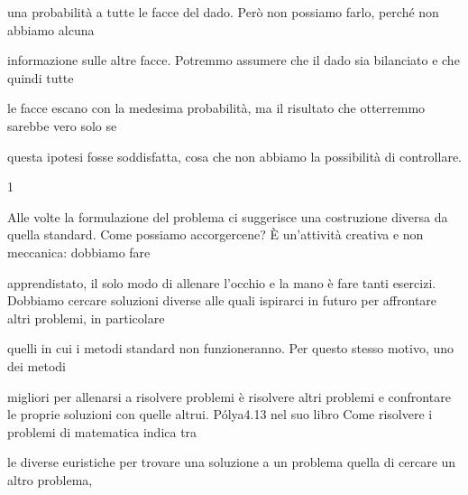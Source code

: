 \documentclass[a4paper,portrait,12pt]{article}
\begin{document}
\begin{flushleft}
una probabilit\`{a} a tutte le facce del dado. Per\`{o} non possiamo farlo, perch\'{e} non abbiamo alcuna
\end{flushleft}


\begin{flushleft}
informazione sulle altre facce. Potremmo assumere che il dado sia bilanciato e che quindi tutte
\end{flushleft}


\begin{flushleft}
le facce escano con la medesima probabilit\`{a}, ma il risultato che otterremmo sarebbe vero solo se
\end{flushleft}


\begin{flushleft}
questa ipotesi fosse soddisfatta, cosa che non abbiamo la possibilit\`{a} di controllare.
\end{flushleft}


1





\begin{flushleft}
Alle volte la formulazione del problema ci suggerisce una costruzione diversa da quella standard. Come possiamo accorgercene? \`{E} un'attivit\`{a} creativa e non meccanica: dobbiamo fare
\end{flushleft}


\begin{flushleft}
apprendistato, il solo modo di allenare l'occhio e la mano \`{e} fare tanti esercizi. Dobbiamo cercare soluzioni diverse alle quali ispirarci in futuro per affrontare altri problemi, in particolare
\end{flushleft}


\begin{flushleft}
quelli in cui i metodi standard non funzioneranno. Per questo stesso motivo, uno dei metodi
\end{flushleft}


\begin{flushleft}
migliori per allenarsi a risolvere problemi \`{e} risolvere altri problemi e confrontare le proprie soluzioni con quelle altrui. P\'{o}lya4.13 nel suo libro Come risolvere i problemi di matematica indica tra
\end{flushleft}


\begin{flushleft}
le diverse euristiche per trovare una soluzione a un problema quella di cercare un altro problema,
\end{flushleft}
\end{document}
